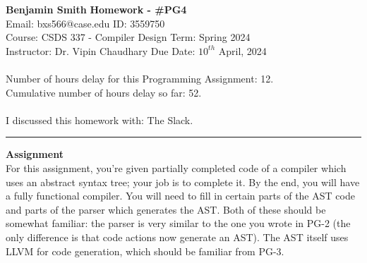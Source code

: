 \documentclass[a4paper, 11pt]{article}
\begin{document}
\noindent
\large\textbf{Benjamin Smith} \hfill \textbf{Homework - \#PG4}   \\
Email: bxs566@case.edu \hfill ID: 3559750 \\
\normalsize Course: CSDS 337 - Compiler Design \hfill Term: Spring 2024\\
Instructor: Dr. Vipin Chaudhary \hfill Due Date: $10^{th}$ April, 2024 \\ \\
Number of hours delay for this Programming Assignment: \hfill 12.\\
Cumulative number of hours delay so far: \hfill 52. \\ \\
I discussed this homework with: \hfill The Slack. \\
\noindent\rule{7in}{2.8pt}



\large\textbf{Assignment} \\
For this assignment, you're given partially completed code of a compiler which uses an abstract syntax tree; your job is to complete it. By the end, you will have a fully functional compiler. You will need to fill in certain parts of the AST code and parts of the parser which generates the AST. Both of these should be somewhat familiar: the parser is very similar to the one you wrote in PG-2 (the only difference is that code actions now generate an AST). The AST itself uses LLVM for code generation, which should be familiar from PG-3.
\end{document}
